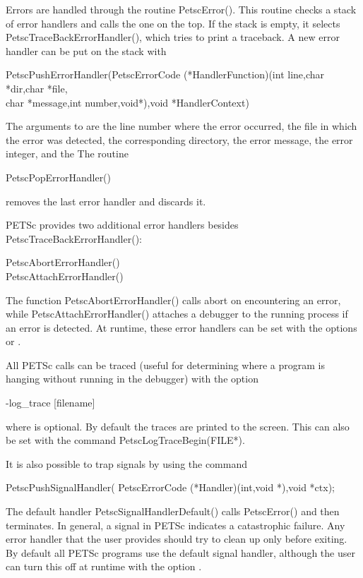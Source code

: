 {{Errors are handled through the routine PetscError().
This routine
checks a stack of error handlers and calls the one on the top.
If the stack is empty, it selects PetscTraceBackErrorHandler(),
which tries to print a traceback.
A new error handler can be put on the stack with
\begin{tabbing}
  PetscPushErrorHandler(PetscErrorCode (*HandlerFunction)(int line,char *dir,char *file,\\
                                char *message,int number,void*),void *HandlerContext)
\end{tabbing}
The arguments to  are the line number where
the error occurred, the file in which the error was detected, the corresponding
directory, the error message, the error integer, and the 
The routine
\begin{tabbing}
  PetscPopErrorHandler()
\end{tabbing}
removes the last error handler and discards it.

PETSc provides two additional error handlers besides
PetscTraceBackErrorHandler():
\begin{tabbing}
   PetscAbortErrorHandler()\\
   PetscAttachErrorHandler()
\end{tabbing}
The function PetscAbortErrorHandler() calls abort on encountering an error, while
PetscAttachErrorHandler() attaches a debugger to the running process
if an error is detected. At runtime, these error handlers can be set
with the options  or   .

All PETSc calls can be traced (useful for determining where a program is
hanging without running in the debugger) with the option
\begin{tabbing}
  -log\_trace [filename]
\end{tabbing}
where  is optional. By default the traces are printed to the
screen.  This can also be set with the
command PetscLogTraceBegin(FILE*). 


It is also possible to trap signals by using the 
command
\begin{tabbing}
  PetscPushSignalHandler( PetscErrorCode (*Handler)(int,void *),void *ctx);
\end{tabbing}
The default handler PetscSignalHandlerDefault()
calls
PetscError() and then terminates. In general, a signal in PETSc
indicates a catastrophic failure.  Any error handler that the user provides
should try to clean up only before exiting.  By default all PETSc programs
use the default signal handler, although the user can turn this off
at runtime with the
option  .

}}
